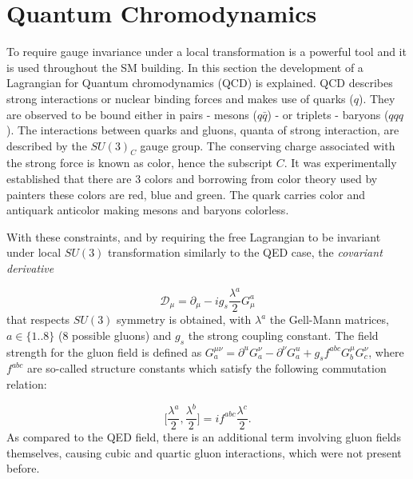 \section{Quantum Chromodynamics}
\label{qcd}
To require gauge invariance under a local transformation is a powerful tool and it is used throughout the \gls{SM} building. In this section the development of a Lagrangian for Quantum chromodynamics (\gls{QCD}) is explained. \gls{QCD} describes strong interactions or nuclear binding forces and makes use of quarks ($q$). They are observed to be bound either in pairs - mesons ($q\bar{q}$) - or triplets - baryons ($qqq$). The interactions between quarks and gluons, quanta of strong interaction, are described by the $SU(3)_{C}$ gauge group. The conserving charge associated with the strong force is known as color, hence the subscript $C$. It was experimentally established that there are 3 colors and borrowing from color theory used by painters these colors are red, blue and green. The quark carries color and antiquark anticolor making mesons and baryons colorless. %

With these constraints, and by requiring the free Lagrangian to be invariant under local $SU(3)$ transformation similarly to the \gls{QED} case, the \textit{covariant derivative}

\begin{equation}
\mathcal{D}_{\mu} = \partial_{\mu} - ig_{s}\frac{\lambda^{a}}{2}G^{a}_{\mu}
\end{equation}
 that respects $SU(3)$ symmetry is obtained, with $\lambda^{a}$ the Gell-Mann matrices, $a\in\{1..8\}$ (8 possible gluons) and $g_{s}$ the strong coupling constant. The field strength for the gluon field is defined as $G_{a}^{\mu\nu}=\partial^{u}G_{a}^{\nu} - \partial^{\nu}G_{a}^{u} + g_{s}f^{abc}G_{b}^{\mu}G_{c}^{\nu}$, where $f^{abc}$ are so-called structure constants which satisfy the following commutation relation:

\begin{equation}
	\Big[\frac{\lambda^{a}}{2},\frac{\lambda^{b}}{2}\Big] = if^{abc}\frac{\lambda^{c}}{2}.
\end{equation}
As compared to the \gls{QED} field, there is an additional term involving gluon fields themselves, causing cubic and quartic gluon interactions, which were not present before.

